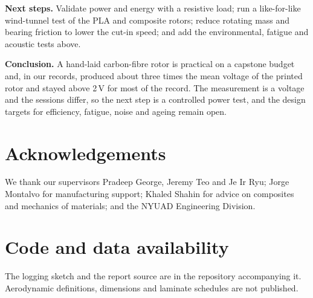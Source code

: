 \documentclass[11pt,letterpaper]{article}
\begin{document}
\textbf{Next steps.} Validate power and energy with a resistive load; run a like-for-like wind-tunnel test of the PLA and composite rotors; reduce rotating mass and bearing friction to lower the cut-in speed; and add the environmental, fatigue and acoustic tests above.

\textbf{Conclusion.} A hand-laid carbon-fibre rotor is practical on a capstone budget and, in our records, produced about three times the mean voltage of the printed rotor and stayed above 2\,V for most of the record. The measurement is a voltage and the sessions differ, so the next step is a controlled power test, and the design targets for efficiency, fatigue, noise and ageing remain open.

\section*{Acknowledgements}
We thank our supervisors Pradeep George, Jeremy Teo and Je Ir Ryu; Jorge Montalvo for manufacturing support; Khaled Shahin for advice on composites and mechanics of materials; and the NYUAD Engineering Division.

\section*{Code and data availability}
The logging sketch and the report source are in the repository accompanying it. Aerodynamic definitions, dimensions and laminate schedules are not published.



\end{document}
